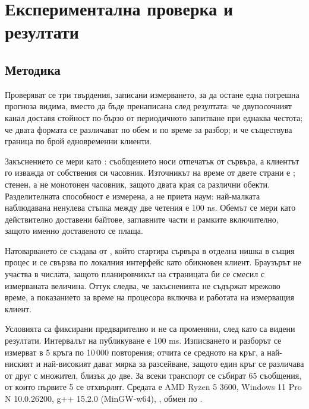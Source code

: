 \section{Експериментална проверка и резултати}
\label{sec:results}

\subsection{Методика}
\label{sec:method}

Проверяват се три твърдения, записани  измерването, за да остане една погрешна
прогноза видима, вместо да бъде пренаписана след резултата: че двупосочният канал доставя
стойност по-бързо от периодичното запитване при еднаква честота; че двата формата се различават
по обем и по време за разбор; и че съществува граница по брой едновременни клиенти.

Закъснението се мери като : съобщението носи
отпечатък от сървъра, а клиентът го изважда от собствения си часовник. Източникът на време от
двете страни е ; стенен, а не монотонен часовник, защото двата
края са различни обекти. Разделителната способност е измерена, а не приета наум: най-малката
наблюдавана ненулева стъпка между две четения е 100 ns. Обемът се мери като действително
доставени байтове, заглавните части и рамките включително, защото именно доставеното се плаща.

Натоварването се създава от , който стартира сървъра в отделна нишка в същия
процес и се свързва по локалния интерфейс като обикновен клиент. Браузърът не участва в
числата, защото планировчикът на страницата би се смесил с измерваната величина. Оттук следва,
че закъсненията не съдържат мрежово време, а показанието за време на процесора включва и
работата на измерващия клиент.

Условията са фиксирани предварително и не са променяни, след като са видени резултати.
Интервалът на публикуване е 100 ms. Изписването и разборът се измерват в 5 кръга по 10\,000
повторения; отчита се средното на  кръг, а най-ниският и най-високият дават мярка
за разсейване, защото един кръг се различава от друг с множител, близък до две. За всеки
транспорт се събират 65 съобщения, от които първите 5 се отхвърлят. Средата е AMD Ryzen 5 3600,
Windows 11 Pro N 10.0.26200, g++ 15.2.0 (MinGW-w64), , обмен по
.


